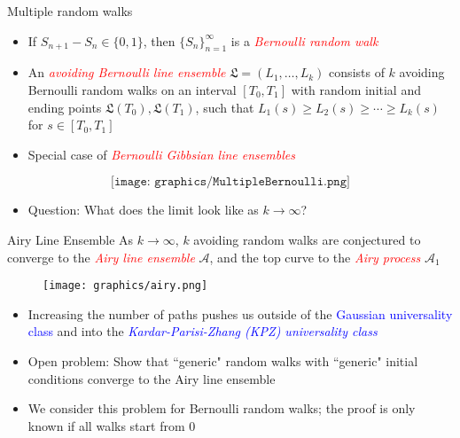 \documentclass[9pt,t,dvipsnames]{beamer}
\begin{document}
\begin{frame}{Multiple random walks}
	
	\begin{itemize}
		
	\item If $S_{n+1} - S_n \in \{0, 1\}$, then $\{S_n\}_{n=1}^\infty$ is a \textcolor{red}{\textit{Bernoulli random walk}} 
	
	\item An \textcolor{red}{\textit{avoiding Bernoulli line ensemble}} $\mathfrak{L} = (L_1,\dots,L_k)$ consists of $k$ avoiding Bernoulli random walks on an interval $[T_0,T_1]$ with random initial and ending points $\mathfrak{L}(T_0),\mathfrak{L}(T_1)$, such that $L_1(s) \geq L_2(s) \geq \cdots \geq L_k(s)$ for $s\in[T_0,T_1]$
	
	\item Special case of \textcolor{red}{\textit{Bernoulli Gibbsian line ensembles}}
	
	\end{itemize}
\[
	\texttt{[image: graphics/MultipleBernoulli.png]}
\]
	\begin{itemize}
		\item Question: What does the limit look like as $k\to\infty$?
	\end{itemize}
\end{frame}

\begin{frame}{Airy Line Ensemble}
As $k \to \infty$, $k$ avoiding random walks are conjectured to converge to the \textit{\textcolor{red}{Airy line ensemble}} $\mathcal{A}$, and the top curve to the \textit{\textcolor{red}{Airy process}} $\mathcal{A}_1$
\begin{figure}
	\texttt{[image: graphics/airy.png]}
\end{figure}

\begin{itemize}
	
	\item Increasing the number of paths pushes us outside of the \textcolor{blue}{Gaussian universality class} and into the \textcolor{blue}{\textit{Kardar-Parisi-Zhang (KPZ) universality class}}
	
	\item Open problem: Show that ``generic" random walks with ``generic" initial conditions converge to the Airy line ensemble
	
	\item We consider this problem for Bernoulli random walks; the proof is only known if all walks start from 0
	
\end{itemize}
\end{frame}
\end{document}
